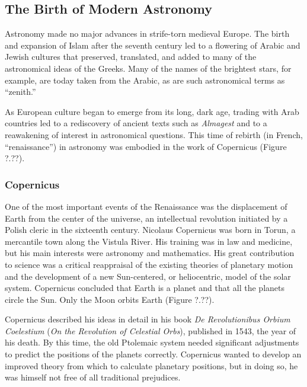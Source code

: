 \documentclass[../../main-astronomy.tex]{subfiles}
\begin{document}
\subsection{The Birth of Modern Astronomy}

Astronomy made no major advances in strife-torn medieval Europe. The birth and expansion of Islam after the seventh century led to a flowering of Arabic and Jewish cultures that preserved, translated, and added to many of the astronomical ideas of the Greeks. Many of the names of the brightest stars, for example, are today taken from the Arabic, as are such astronomical terms as ``zenith.''

\vspace{1em}

As European culture began to emerge from its long, dark age, trading with Arab countries led to a rediscovery of ancient texts such as \textit{Almagest} and to a reawakening of interest in astronomical questions. This time of rebirth (in French, ``renaissance'') in astronomy was embodied in the work of Copernicus (Figure ?.??).

\vspace{1em}


\subsubsection*{Copernicus}

One of the most important events of the Renaissance was the displacement of Earth from the center of the universe, an intellectual revolution initiated by a Polish cleric in the sixteenth century. Nicolaus Copernicus was born in Torun, a mercantile town along the Vistula River. His training was in law and medicine, but his main interests were astronomy and mathematics. His great contribution to science was a critical reappraisal of the existing theories of planetary motion and the development of a new Sun-centered, or \gls{heliocentric}, model of the solar system. Copernicus concluded that Earth is a planet and that all the planets circle the Sun. Only the Moon orbits Earth (Figure ?.??).

\vspace{1em}


Copernicus described his ideas in detail in his book \textit{De Revolutionibus Orbium Coelestium} (\textit{On the Revolution of Celestial Orbs}), published in 1543, the year of his death. By this time, the old Ptolemaic system needed significant adjustments to predict the positions of the planets correctly. Copernicus wanted to develop an improved theory from which to calculate planetary positions, but in doing so, he was himself not free of all traditional prejudices.
\end{document}
